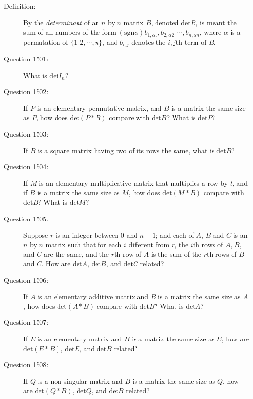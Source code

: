 \documentclass{article}
\begin{document}
\begin{description}

  \item[Definition:] By the \emph{determinant} of an $n$ by $n$ matrix $B$, denoted $\text{det} B$, is meant the sum of all numbers of the form $(\text{sgn} \alpha) b_{1,\alpha 1}, b_{2,\alpha 2}, \cdots, b_{n,\alpha n}$, where $\alpha$ is a permutation of $\{ 1, 2, \cdots, n \}$, and $b_{i,j}$ denotes the $i,j$th term of $B$.

  \item[Question 1501:] What is $\text{det} I_{n}$?

  \item[Question 1502:] If $P$ is an elementary permutative matrix, and $B$ is a matrix the same size as $P$, how does $\text{det} (P*B)$ compare with $\text{det} B$? What is $\text{det} P$?

  \item[Question 1503:] If $B$ is a square matrix having two of its rows the same, what is $\text{det} B$?

  \item[Question 1504:] If $M$ is an elementary multiplicative matrix that multiplies a row by $t$, and if $B$ is a matrix the same size as $M$, how does $\text{det} (M*B)$ compare with $\text{det} B$? What is $\text{det} M$?

  \item[Question 1505:] Suppose $r$ is an integer between $0$ and $n+1$; and each of $A$, $B$ and $C$ is an $n$ by $n$ matrix such that for each $i$ different from $r$, the $i$th rows of $A$, $B$, and $C$ are the same, and the $r$th row of $A$ is the sum of the $r$th rows of $B$ and $C$. How are $\text{det} A$, $\text{det} B$, and $\text{det} C$ related?

  \item[Question 1506:] If $A$ is an elementary additive matrix and $B$ is a matrix the same size as $A$, how does $\text{det} (A*B)$ compare with $\text{det} B$? What is $\text{det} A$?

  \item[Question 1507:] If $E$ is an elementary matrix and $B$ is a matrix the same size as $E$, how are $\text{det} (E*B)$, $\text{det} E$, and $\text{det} B$ related?

  \item[Question 1508:] If $Q$ is a non-singular matrix and $B$ is a matrix the same size as $Q$, how are $\text{det} (Q*B)$, $\text{det} Q$, and $\text{det} B$ related?


\end{description}
\end{document}
